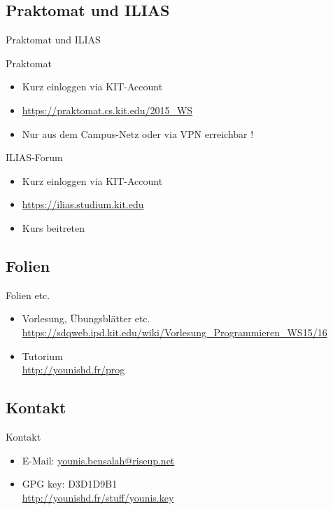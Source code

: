 \documentclass[18pt]{beamer}
\begin{document}
\subsection{Praktomat und ILIAS}
\begin{frame}{Praktomat und ILIAS}
    \begin{block}{Praktomat}
        \begin{itemize}
            \item Kurz einloggen via KIT-Account
            \item \url{https://praktomat.cs.kit.edu/2015\_WS}
            \item Nur aus dem Campus-Netz oder via VPN erreichbar !
        \end{itemize}
    \end{block}
    \pause

    \begin{block}{ILIAS-Forum}
        \begin{itemize}
            \item Kurz einloggen via KIT-Account
            \item \url{https://ilias.studium.kit.edu}
            \item Kurs beitreten
        \end{itemize}
    \end{block}
\end{frame}

\subsection{Folien}
\begin{frame}{Folien etc.}
    \begin{itemize}
        \item Vorlesung, Übungsblätter etc.\\ \url{https://sdqweb.ipd.kit.edu/wiki/Vorlesung\_Programmieren\_WS15/16}
        \item Tutorium \\ \url{http://younishd.fr/prog}
    \end{itemize}
\end{frame}

\subsection{Kontakt}
\begin{frame}{Kontakt}
    \begin{itemize}
        \item E-Mail: \url{younis.bensalah@riseup.net}
        \item GPG key: D3D1D9B1\\ \url{http://younishd.fr/stuff/younis.key}
    \end{itemize}
\end{frame}
\end{document}
